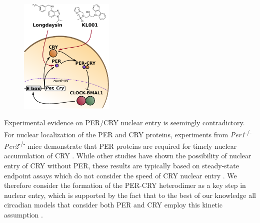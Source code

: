 \begin{figure}[h]
  \centering
  \includegraphics[width=0.4\textwidth]{chap4/figures/fig1_schem.pdf}
  \label{fig:4-1a}
\end{figure}

Experimental evidence on PER/CRY nuclear entry is seemingly contradictory. 
For nuclear localization of the PER and CRY proteins, experiments from {\it Per1}\textsuperscript{-/-} {\it Per2}\textsuperscript{-/-} mice demonstrate that PER proteins are required for timely nuclear accumulation of CRY \cite{Lee2001}. 
While other studies have shown the possibility of nuclear entry of CRY without PER, these results are typically based on steady-state endpoint assays which do not consider the speed of CRY nuclear entry \cite{Ye2011, Kume1999, Yagita2002}. 
We therefore consider the formation of the PER-CRY heterodimer as a key step in nuclear entry, which is supported by the fact that to the best of our knowledge all circadian models that consider both PER and CRY employ this kinetic assumption \cite{Hirota2012, Relogio2011, Leloup2003, Forger2003, Mirsky2009}.

